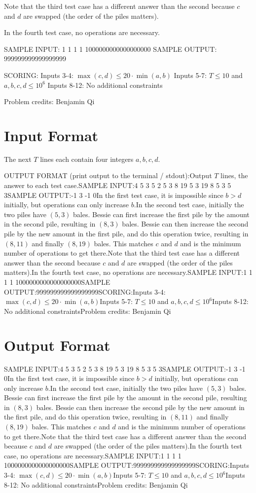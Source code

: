 \documentclass[12pt]{article}
\begin{document}
Note that the third test case has a different answer than the second because $c$
and $d$ are swapped (the order of the piles matters).

In the fourth test case, no operations are necessary.

SAMPLE INPUT:
1
1 1 1 1000000000000000000
SAMPLE OUTPUT: 
999999999999999999

SCORING:
Inputs 3-4: $\max(c, d) \le 20 \cdot\min(a, b)$ Inputs 5-7: $T \le 10$ and $a,b,c,d\le 10^6$ Inputs 8-12: No additional constraints


Problem credits: Benjamin Qi



\section*{Input Format}
The next $T$ lines each contain four integers $a,b,c,d$.

OUTPUT FORMAT (print output to the terminal / stdout):Output $T$ lines, the answer to each test case.SAMPLE INPUT:4
5 3 5 2
5 3 8 19
5 3 19 8
5 3 5 3SAMPLE OUTPUT:-1
3
-1
0In the first test case, it is impossible since $b>d$ initially, but operations
can only increase $b$.In the second test case, initially the two piles have $(5, 3)$ bales.  Bessie
can first increase the first pile by the amount in the second pile, resulting in
$(8, 3)$ bales.  Bessie can then increase the second pile by the new amount in
the first pile, and do this operation twice, resulting in $(8, 11)$ and finally
$(8, 19)$ bales.  This matches $c$ and $d$ and is the minimum number of
operations to get there.Note that the third test case has a different answer than the second because $c$
and $d$ are swapped (the order of the piles matters).In the fourth test case, no operations are necessary.SAMPLE INPUT:1
1 1 1 1000000000000000000SAMPLE OUTPUT:999999999999999999SCORING:Inputs 3-4: $\max(c, d) \le 20 \cdot\min(a, b)$Inputs 5-7: $T \le 10$ and $a,b,c,d\le 10^6$Inputs 8-12: No additional constraintsProblem credits: Benjamin Qi

\section*{Output Format}
SAMPLE INPUT:4
5 3 5 2
5 3 8 19
5 3 19 8
5 3 5 3SAMPLE OUTPUT:-1
3
-1
0In the first test case, it is impossible since $b>d$ initially, but operations
can only increase $b$.In the second test case, initially the two piles have $(5, 3)$ bales.  Bessie
can first increase the first pile by the amount in the second pile, resulting in
$(8, 3)$ bales.  Bessie can then increase the second pile by the new amount in
the first pile, and do this operation twice, resulting in $(8, 11)$ and finally
$(8, 19)$ bales.  This matches $c$ and $d$ and is the minimum number of
operations to get there.Note that the third test case has a different answer than the second because $c$
and $d$ are swapped (the order of the piles matters).In the fourth test case, no operations are necessary.SAMPLE INPUT:1
1 1 1 1000000000000000000SAMPLE OUTPUT:999999999999999999SCORING:Inputs 3-4: $\max(c, d) \le 20 \cdot\min(a, b)$Inputs 5-7: $T \le 10$ and $a,b,c,d\le 10^6$Inputs 8-12: No additional constraintsProblem credits: Benjamin Qi
\end{document}
